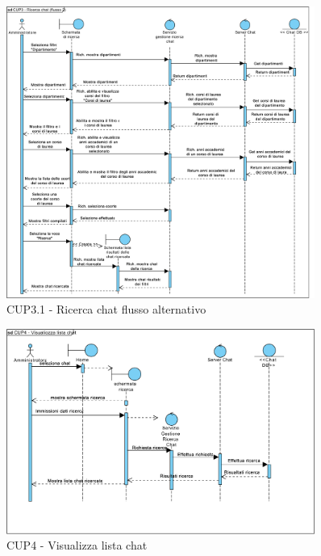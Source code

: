 \begin{figure}
	\centering
	\includegraphics[width=0.9\textwidth]{imgs/gruppo6/sequence/CUP3_ricerca_chat_flusso_2.pdf}
	\caption{CUP3.1 - Ricerca chat flusso alternativo}
	\label{fig:seq-cup3mod}
\end{figure}

\begin{figure}
	\centering
	\includegraphics[width=0.9\textwidth]{imgs/gruppo6/sequence/CUP4_visualizza_lista_chat.pdf}
	\caption{CUP4 - Visualizza lista chat}
	\label{fig:seq-cup4}
\end{figure}

